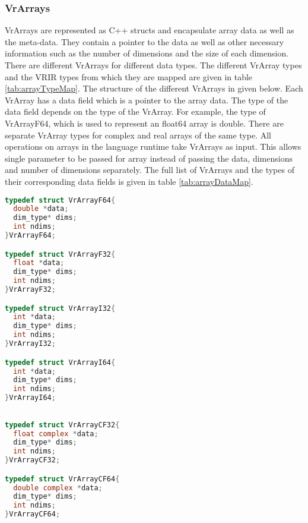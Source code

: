 \subsubsection{VrArrays}
VrArrays are represented as C++ structs and encapsulate array data as well as the meta-data. They contain a pointer to the data as well as other necessary information such as the number of dimensions and the size of each dimension. There are different VrArrays for different data types. The different VrArray types and the VRIR types from which they are mapped are given in table \ref{tab:arrayTypeMap}. The structure of the different VrArrays in given below. Each VrArray has a data field which is a pointer to the array data. The type of the data field depends on the type of the VrArray. For example, the type of VrArrayF64, which is used to represent an float64 array is double. 
There are separate VrArray types for complex and real arrays of the same type. All operations on arrays in the language runtime take VrArrays as input. This allows single parameter to be passed for array instead of passing the data, dimensions and number of dimensions separately. The full list of VrArrays and the types of their corresponding data fields is given in table \ref{tab:arrayDataMap}.
\begin{lstlisting}[language=c, label={vrArrayF64Struct}, caption={Structures of VrArrays for real data}]
typedef struct VrArrayF64{
  double *data;
  dim_type* dims;  
  int ndims;
}VrArrayF64;

typedef struct VrArrayF32{
  float *data;
  dim_type* dims;  
  int ndims;
}VrArrayF32;

typedef struct VrArrayI32{
  int *data;
  dim_type* dims;  
  int ndims;
}VrArrayI32;

typedef struct VrArrayI64{
  int *data;
  dim_type* dims;  
  int ndims;
}VrArrayI64;

\end{lstlisting}

\begin{lstlisting}[language=c, label={vrArrayF64Struct}, caption={Structures of VrArrays for complex data}]

typedef struct VrArrayCF32{
  float complex *data;
  dim_type* dims;  
  int ndims;
}VrArrayCF32;

typedef struct VrArrayCF64{
  double complex *data;
  dim_type* dims;  
  int ndims;
}VrArrayCF64;

\end{lstlisting}

